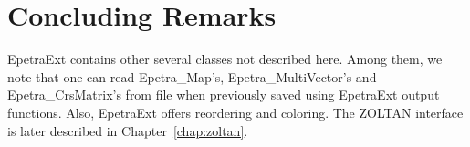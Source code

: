 \section{Concluding Remarks}
\label{sec:epetraext_concluding}

EpetraExt contains other several classes not described here. Among them, we
note that one can read Epetra\_Map's, Epetra\_MultiVector's and
Epetra\_CrsMatrix's from file when previously saved using EpetraExt output
functions. Also, EpetraExt offers reordering and coloring. The ZOLTAN
interface is later described in Chapter~\ref{chap:zoltan}.
